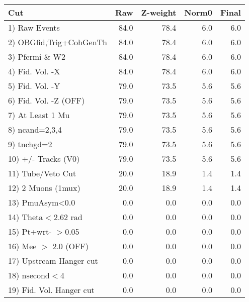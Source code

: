  \begin{table}[h!]\centering
 \begin{tabular}{||l||r|r|r|r||}
 \hline
 \hline
 Cut & Raw & Z-weight & Norm0 & Final \\
 \hline
  1) Raw Events           &        84.0 &        78.4 &         6.0 &         6.0 \\
  2) OBGfid,Trig+CohGenTh &        84.0 &        78.4 &         6.0 &         6.0 \\
  3) Pfermi \& W2         &        84.0 &        78.4 &         6.0 &         6.0 \\
  4) Fid. Vol. -X         &        84.0 &        78.4 &         6.0 &         6.0 \\
  5) Fid. Vol. -Y         &        79.0 &        73.5 &         5.6 &         5.6 \\
  6) Fid. Vol. -Z (OFF)   &        79.0 &        73.5 &         5.6 &         5.6 \\
  7) At Least 1 Mu        &        79.0 &        73.5 &         5.6 &         5.6 \\
  8) ncand=2,3,4          &        79.0 &        73.5 &         5.6 &         5.6 \\
  9) tnchgd=2             &        79.0 &        73.5 &         5.6 &         5.6 \\
 10) +/- Tracks (V0)      &        79.0 &        73.5 &         5.6 &         5.6 \\
 11) Tube/Veto Cut        &        20.0 &        18.9 &         1.4 &         1.4 \\
 12) 2 Muons (1mux)       &        20.0 &        18.9 &         1.4 &         1.4 \\
 13) PmuAsym<0.0          &         0.0 &         0.0 &         0.0 &         0.0 \\
 14) Theta$<$2.62 rad     &         0.0 &         0.0 &         0.0 &         0.0 \\
 15) Pt+wrt- $>$0.05      &         0.0 &         0.0 &         0.0 &         0.0 \\
 16) Mee $>$ 2.0  (OFF)   &         0.0 &         0.0 &         0.0 &         0.0 \\
 17) Upstream Hanger cut  &         0.0 &         0.0 &         0.0 &         0.0 \\
 18) nsecond$<$4          &         0.0 &         0.0 &         0.0 &         0.0 \\
 19) Fid. Vol. Hanger cut &         0.0 &         0.0 &         0.0 &         0.0 \\

\end{tabular}
\end{table}
